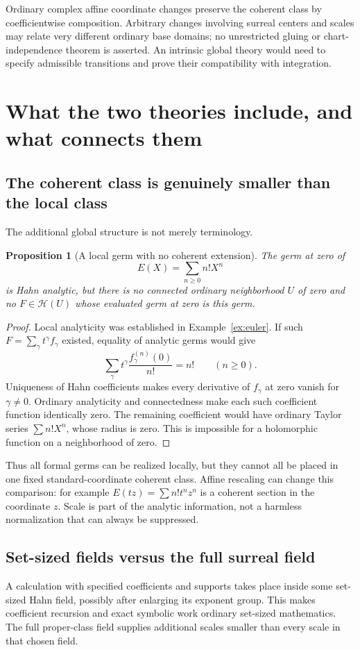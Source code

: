 \documentclass[11pt,a4paper]{article}
\newtheorem{proposition}[theorem]{Proposition}
\theoremstyle{definition}\newtheorem{definition}[theorem]{Definition}
\theoremstyle{remark}\newtheorem{remark}[theorem]{Remark}
\newcommand{\A}{\mathscr H}\newcommand{\hol}{\mathcal O}
\numberwithin{equation}{section}
\begin{document}
Ordinary complex affine coordinate changes preserve the coherent class by coefficientwise composition. Arbitrary changes involving surreal centers and scales may relate very different ordinary base domains; no unrestricted gluing or chart-independence theorem is asserted. An intrinsic global theory would need to specify admissible transitions and prove their compatibility with integration.

\section{What the two theories include, and what connects them}\label{sec:comparison}

\subsection{The coherent class is genuinely smaller than the local class}
The additional global structure is not merely terminology.

\begin{proposition}[A local germ with no coherent extension]\label{prop:strictness}
The germ at zero of
\[
 E(X)=\sum_{n\geq0}n!X^n
\]
is Hahn analytic, but there is no connected ordinary neighborhood $U$ of zero and no $F\in\A(U)$ whose evaluated germ at zero is this germ.
\end{proposition}
\begin{proof}
Local analyticity was established in Example~\ref{ex:euler}. If such $F=\sum_\gamma t^\gamma f_\gamma$ existed, equality of analytic germs would give
\[
 \sum_\gamma t^\gamma\frac{f_\gamma^{(n)}(0)}{n!}=n!
 \qquad(n\geq0).
\]
Uniqueness of Hahn coefficients makes every derivative of $f_\gamma$ at zero vanish for $\gamma\ne0$. Ordinary analyticity and connectedness make each such coefficient function identically zero. The remaining coefficient would have ordinary Taylor series $\sum n!X^n$, whose radius is zero. This is impossible for a holomorphic function on a neighborhood of zero.
\end{proof}
Thus all formal germs can be realized locally, but they cannot all be placed in one fixed standard-coordinate coherent class. Affine rescaling can change this comparison: for example $E(tz)=\sum n!t^nz^n$ is a coherent section in the coordinate $z$. Scale is part of the analytic information, not a harmless normalization that can always be suppressed.

\subsection{Set-sized fields versus the full surreal field}
A calculation with specified coefficients and supports takes place inside some set-sized Hahn field, possibly after enlarging its exponent group. This makes coefficient recursion and exact symbolic work ordinary set-sized mathematics. The full proper-class field supplies additional scales smaller than every scale in that chosen field.
\end{document}

